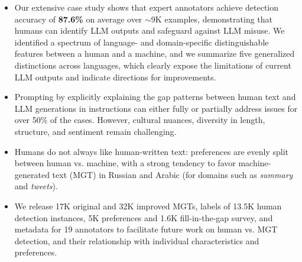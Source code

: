 \begin{itemize}
    \item Our extensive case study shows that expert annotators achieve detection accuracy of \textbf{87.6\%} on average over $\sim$9K examples, demonstrating that humans can identify LLM outputs and safeguard against LLM misuse. We identified a spectrum of language- and domain-specific distinguishable features between a human and a machine, and we summarize five generalized distinctions across languages, which clearly expose the limitations of current LLM outputs and indicate directions for improvements. 
    \item Prompting by explicitly explaining the gap patterns between human text and LLM generations in instructions can either fully or partially address issues for over 50\% of the cases. However, cultural nuances, diversity in length, structure, and sentiment remain challenging.
    \item Humans do not always like human-written text: preferences are evenly split between human vs. machine, with a strong tendency to favor machine-generated text (MGT) in Russian and Arabic (for domains such as \emph{summary} and \emph{tweets}).
    
    \item We release 17K original and 32K improved MGTs, labels of 13.5K human detection instances, 5K preferences and 1.6K fill-in-the-gap survey, and metadata for 19 annotators to facilitate future work on human vs. MGT detection, and their relationship with individual characteristics and preferences.  
\end{itemize}


